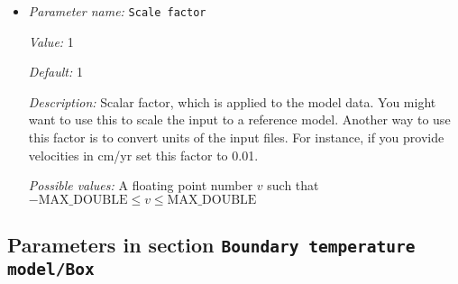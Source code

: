 \begin{itemize}
{\it Value:} 0


{\it Default:} 0


{\it Description:} Number of the first velocity file to be loaded when the model time is larger than `First velocity file model time'.


{\it Possible values:} An integer $n$ such that $-2147483648\leq n \leq 2147483647$
\item {\it Parameter name:} {\tt Scale factor}
\label{parameters:Boundary temperature model/Ascii data model/Scale factor}


{\it Value:} 1


{\it Default:} 1


{\it Description:} Scalar factor, which is applied to the model data. You might want to use this to scale the input to a reference model. Another way to use this factor is to convert units of the input files. For instance, if you provide velocities in cm/yr set this factor to 0.01.


{\it Possible values:} A floating point number $v$ such that $-\text{MAX\_DOUBLE} \leq v \leq \text{MAX\_DOUBLE}$
\end{itemize}

\subsection{Parameters in section \tt Boundary temperature model/Box}
\label{parameters:Boundary_20temperature_20model/Box}

